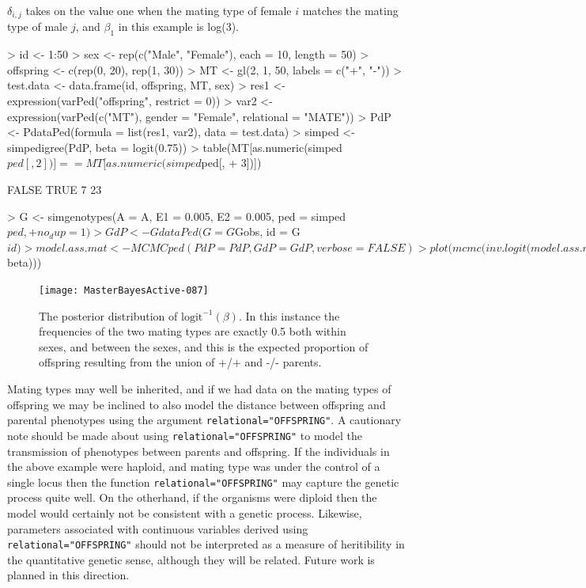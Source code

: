 \documentclass{article}
\begin{document}
$\delta_{i,j}$ takes on the value one when the mating type of female $i$ matches the mating type of male $j$, and $\beta_{1}$ in this example is log(3).

\begin{Schunk}
\begin{Sinput}
> id <- 1:50
> sex <- rep(c("Male", "Female"), each = 10, length = 50)
> offspring <- c(rep(0, 20), rep(1, 30))
> MT <- gl(2, 1, 50, labels = c("+", "-"))
> test.data <- data.frame(id, offspring, MT, sex)
> res1 <- expression(varPed("offspring", restrict = 0))
> var2 <- expression(varPed(c("MT"), gender = "Female", relational = "MATE"))
> PdP <- PdataPed(formula = list(res1, var2), data = test.data)
> simped <- simpedigree(PdP, beta = logit(0.75))
> table(MT[as.numeric(simped$ped[, 2])] == MT[as.numeric(simped$ped[, 
+     3])])
\end{Sinput}
\begin{Soutput}
FALSE  TRUE 
    7    23 
\end{Soutput}
\begin{Sinput}
> G <- simgenotypes(A = A, E1 = 0.005, E2 = 0.005, ped = simped$ped, 
+     no_dup = 1)
> GdP <- GdataPed(G = G$Gobs, id = G$id)
> model.ass.mat <- MCMCped(PdP = PdP, GdP = GdP, verbose = FALSE)
> plot(mcmc(inv.logit(model.ass.mat$beta)))
\end{Sinput}
\end{Schunk}


\begin{figure}[!h]
\begin{center}
\texttt{[image: MasterBayesActive-087]}
\end{center}
\caption{The posterior distribution of $\textrm{logit}^{-1}(\beta)$.  In this instance the frequencies of the two mating types are exactly 0.5 both within sexes, and between the sexes, and this is the expected proportion of offspring resulting from the union of +/+ and -/- parents.}
\label{model.ass.mat}
\end{figure}

Mating types may well be inherited, and if we had data on the mating types of offspring we may be inclined to also model the distance between offspring and parental phenotypes using the argument \texttt{relational="OFFSPRING"}.  A cautionary note should be made about using \texttt{relational="OFFSPRING"} to model the transmission of phenotypes between parents and offspring.  If the individuals in the above example were haploid, and mating type was under the control of a single locus then the function \texttt{relational="OFFSPRING"} may capture the genetic process quite well.  On the otherhand, if the organisms were diploid then the model would certainly not be consistent with a genetic process.  Likewise, parameters associated with continuous variables derived using \texttt{relational="OFFSPRING"} should not be interpreted as a measure of heritibility in the quantitative genetic sense, although they will be related.  Future work is planned in this direction.
\end{document}
